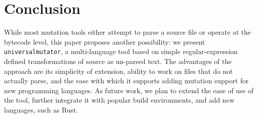\section{Conclusion}

While most mutation tools either attempt to parse a source file or
operate at the bytecode level, this paper proposes another
possibility:  we present {\tt universalmutator}, a multi-language tool based on simple regular-expression
defined transformations of source as un-parsed text.  The advantages
of the approach are its simplicity of extension, ability to work on files that do
not actually parse, and the ease with which it supports adding
mutation support for new programming languages.  As future work, we plan to extend the ease of use of the tool, further integrate it with popular build environments, and add new languages, such as Rust.
